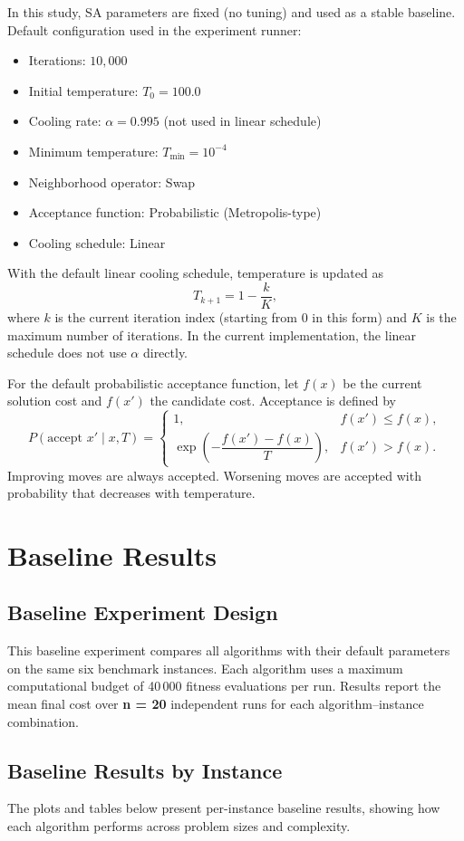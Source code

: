 \documentclass[12pt,a4paper]{report}
\begin{document}
In this study, SA parameters are fixed (no tuning) and used as a stable baseline.
Default configuration used in the experiment runner:
\begin{itemize}
    \item Iterations: $10{,}000$
    \item Initial temperature: $T_0 = 100.0$
    \item Cooling rate: $\alpha = 0.995$ (not used in linear schedule)
    \item Minimum temperature: $T_{\min} = 10^{-4}$
    \item Neighborhood operator: Swap
    \item Acceptance function: Probabilistic (Metropolis-type)
    \item Cooling schedule: Linear
\end{itemize}

With the default linear cooling schedule, temperature is updated as
\[
T_{k+1} = 1 - \frac{k}{K},
\]
where $k$ is the current iteration index (starting from $0$ in this form) and $K$ is the maximum number of iterations. In the current implementation, the linear schedule does not use $\alpha$ directly.

For the default probabilistic acceptance function, let $f(x)$ be the current solution cost and $f(x')$ the candidate cost. Acceptance is defined by
\[
P(\text{accept } x'\mid x, T)=
\begin{cases}
1, & f(x') \le f(x),\\
\exp\!\left(-\dfrac{f(x')-f(x)}{T}\right), & f(x') > f(x).
\end{cases}
\]
Improving moves are always accepted. Worsening moves are accepted with probability that decreases with temperature.


\chapter{Baseline Results}
\section{Baseline Experiment Design}
This baseline experiment compares all algorithms with their default parameters on the same six benchmark instances. Each algorithm uses a maximum computational budget of 40\,000 fitness evaluations per run. Results report the mean final cost over \textbf{n = 20} independent runs for each algorithm–instance combination.

\section{Baseline Results by Instance}
The plots and tables below present per-instance baseline results, showing how each algorithm performs across problem sizes and complexity.
\end{document}
